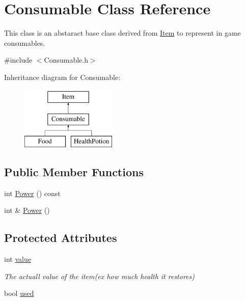 \hypertarget{classConsumable}{\section{Consumable Class Reference}
\label{classConsumable}
}


This class is an abstaract base class derived from \hyperlink{classItem}{Item} to represent in game consumables.  




{\ttfamily \#include $<$Consumable.\-h$>$}

Inheritance diagram for Consumable\-:\begin{figure}[H]
\begin{center}
\leavevmode
\includegraphics[height=3.000000cm]{classConsumable}
\end{center}
\end{figure}
\subsection*{Public Member Functions}
\begin{DoxyCompactItemize}
\item 
int \hyperlink{classConsumable_a5cc8fd73435230310fc270f47f445beb}{Power} () const 
\item 
int \& \hyperlink{classConsumable_a5d6c224100e14b1e04e5986f378b9f8b}{Power} ()
\end{DoxyCompactItemize}
\subsection*{Protected Attributes}
\begin{DoxyCompactItemize}
\item 
int \hyperlink{classConsumable_a492024e0b8fd5b6c6e944116cbff3e32}{value}
\begin{DoxyCompactList}\small\item\em The actuall value of the item(ex how much health it restores) \end{DoxyCompactList}\item 
bool \hyperlink{classConsumable_a261f0f34c301027337ffe6bf32bf0200}{used}
\end{DoxyCompactItemize}
